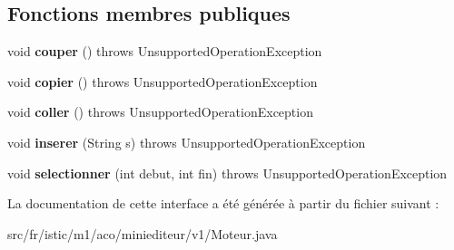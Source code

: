\subsection*{Fonctions membres publiques}
\begin{DoxyCompactItemize}
\item 
\mbox{\label{interfacefr_1_1istic_1_1m1_1_1aco_1_1miniediteur_1_1v1_1_1Moteur_a9848e371756d9a79c6221ddf9a5b9fb0}} 
void {\bfseries couper} ()  throws Unsupported\+Operation\+Exception
\item 
\mbox{\label{interfacefr_1_1istic_1_1m1_1_1aco_1_1miniediteur_1_1v1_1_1Moteur_a4a8f8428d290d0243c13e6b694d25660}} 
void {\bfseries copier} ()  throws Unsupported\+Operation\+Exception
\item 
\mbox{\label{interfacefr_1_1istic_1_1m1_1_1aco_1_1miniediteur_1_1v1_1_1Moteur_a18ecda9d88a1abaa9721d33b6d012d01}} 
void {\bfseries coller} ()  throws Unsupported\+Operation\+Exception
\item 
\mbox{\label{interfacefr_1_1istic_1_1m1_1_1aco_1_1miniediteur_1_1v1_1_1Moteur_a68e1c5499dea3f74d6d019efaebde638}} 
void {\bfseries inserer} (String s)  throws Unsupported\+Operation\+Exception
\item 
\mbox{\label{interfacefr_1_1istic_1_1m1_1_1aco_1_1miniediteur_1_1v1_1_1Moteur_a5ca7f0486e1037b7549077cb5f3ceb91}} 
void {\bfseries selectionner} (int debut, int fin)  throws Unsupported\+Operation\+Exception
\end{DoxyCompactItemize}


La documentation de cette interface a été générée à partir du fichier suivant \+:\begin{DoxyCompactItemize}
\item 
src/fr/istic/m1/aco/miniediteur/v1/Moteur.\+java\end{DoxyCompactItemize}
